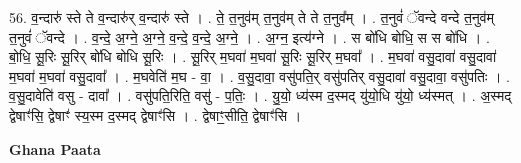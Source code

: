 \documentclass[17pt]{extarticle}
\begin{document}
56. व॒न्दारु॑ स्ते ते व॒न्दारु॑र् व॒न्दारु॑ स्ते । . ते॒ त॒नुव॑म् त॒नुव॑म् ते ते त॒नुव᳚म् । . त॒नुवं॑ ॅवन्दे वन्दे त॒नुव॑म् त॒नुवं॑ ॅवन्दे । . व॒न्दे॒ अ॒ग्ने॒ अ॒ग्ने॒ व॒न्दे॒ व॒न्दे॒ अ॒ग्ने॒ । . अ॒ग्न॒ इत्य॑ग्ने । . स बो॑धि बोधि॒ स स बो॑धि । . बो॒धि॒ सू॒रिः सू॒रिर् बो॑धि बोधि सू॒रिः । . सू॒रिर् म॒घवा॑ म॒घवा॑ सू॒रिः सू॒रिर् म॒घवा᳚ । . म॒घवा॑ वसु॒दावा॑ वसु॒दावा॑ म॒घवा॑ म॒घवा॑ वसु॒दावा᳚ । . म॒घवेति॑ म॒घ - वा॒ । . व॒सु॒दावा॒ वसु॑पति॒र् वसु॑पतिर् वसु॒दावा॑ वसु॒दावा॒ वसु॑पतिः । . व॒सु॒दावेति॑ वसु - दावा᳚ । . वसु॑पति॒रिति॒ वसु॑ - प॒तिः॒ । . यु॒यो॒ ध्य॑स्म द॒स्मद् यु॑यो॒धि यु॑यो॒ ध्य॑स्मत् । . अ॒स्मद् द्वेषाꣳ॑सि॒ द्वेषाꣳ॑ स्य॒स्म द॒स्मद् द्वेषाꣳ॑सि । . द्वेषाꣳ॒॒सीति॒ द्वेषाꣳ॑सि । \newline

\textbf{Ghana Paata } \newline
\end{document}
